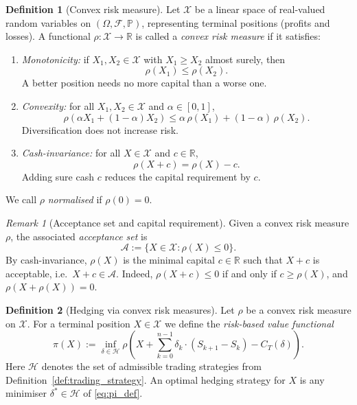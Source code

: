 \documentclass[12pt,a4paper]{article}
\theoremstyle{definition}
\newtheorem{definition}{Definition}[section]
\theoremstyle{plain}
\theoremstyle{remark}
\newtheorem{remark}{Remark}[section]
\theoremstyle{plain}
\begin{document}
\begin{definition}[Convex risk measure]
\label{def:convex_risk_measure}
Let $\mathcal X$ be a linear space of real-valued random variables on $(\Omega,\mathcal F,\mathbb P)$, representing terminal positions (profits and losses). 
A functional $\rho:\mathcal X\to\mathbb R$ is called a \emph{convex risk measure} if it satisfies:
\begin{enumerate}
    \item \emph{Monotonicity:} if $X_1,X_2\in\mathcal X$ with $X_1\ge X_2$ almost surely, then
    \[
        \rho(X_1)\le \rho(X_2).
    \]
    A better position needs no more capital than a worse one.
    \item \emph{Convexity:} for all $X_1,X_2\in\mathcal X$ and $\alpha\in[0,1]$,
    \[
        \rho(\alpha X_1 + (1-\alpha)X_2)
        \le
        \alpha\,\rho(X_1) + (1-\alpha)\,\rho(X_2).
    \]
    Diversification does not increase risk.
    \item \emph{Cash-invariance:} for all $X\in\mathcal X$ and $c\in\mathbb R$,
    \[
        \rho(X + c) = \rho(X) - c.
    \]
    Adding sure cash $c$ reduces the capital requirement by $c$.
\end{enumerate}
We call $\rho$ \emph{normalised} if $\rho(0)=0$.
\end{definition}

\begin{remark}[Acceptance set and capital requirement]
\label{rem:acceptance_set}
Given a convex risk measure $\rho$, the associated \emph{acceptance set} is
\[
    \mathcal A := \{ X\in\mathcal X : \rho(X)\le 0\}.
\]
By cash-invariance, $\rho(X)$ is the minimal capital $c\in\mathbb R$ such that $X+c$ is acceptable, i.e.\ $X+c\in\mathcal A$. 
Indeed, $\rho(X+c)\le 0$ if and only if $c\ge \rho(X)$, and $\rho(X+\rho(X))=0$.
\end{remark}

\begin{definition}[Hedging via convex risk measures]
\label{def:pricing_functional_pi}
Let $\rho$ be a convex risk measure on $\mathcal X$. 
For a terminal position $X\in\mathcal X$ we define the \emph{risk-based value functional}
\begin{equation}
\label{eq:pi_def}
    \pi(X) 
    := \inf_{\delta\in\mathcal H} 
    \rho\!\left(X + \sum_{k=0}^{n-1} \delta_k\cdot(S_{k+1}-S_k) - C_T(\delta)\right).
\end{equation}
Here $\mathcal H$ denotes the set of admissible trading strategies from Definition~\ref{def:trading_strategy}. 
An optimal hedging strategy for $X$ is any minimiser $\delta^\ast\in\mathcal H$ of \eqref{eq:pi_def}.
\end{definition}
\end{document}
